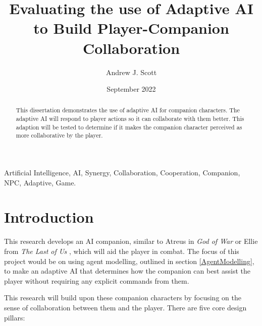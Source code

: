 \documentclass{IEEEtran}
\title{Evaluating the use of Adaptive AI to Build Player-Companion Collaboration}
\author{Andrew J. Scott}
\date{September 2022}
\begin{document}
	\maketitle


\begin{abstract}
This dissertation demonstrates the use of adaptive AI for companion characters. The adaptive AI will respond to player actions so it can collaborate with them better. This adaption will be tested to determine if it makes the companion character perceived as more collaborative by the player.
\end{abstract}

 \begin{IEEEkeywords}
Artificial Intelligence, AI, Synergy, Collaboration, Cooperation, Companion, NPC, Adaptive, Game.
\end{IEEEkeywords}

\section{Introduction}
\label{Intro}

This research develops an AI companion, similar to Atreus in \textit{God of War} \cite{GDCAtreus} or Ellie from \textit{The Last of Us} \cite{GAIP2EllieAI}, which will aid the player in combat. The focus of this project would be on using agent modelling, outlined in section \ref{AgentModelling}, to make an adaptive AI that determines how the companion can best assist the player without requiring any explicit commands from them.

This research will build upon these companion characters by focusing on the sense of collaboration between them and the player. There are five core design pillars:
\end{document}
